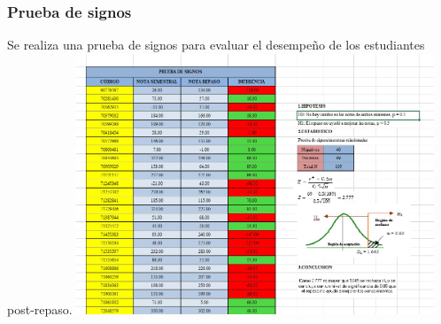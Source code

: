 \begin{frame}
    \frametitle{Prueba de signos}
    Se realiza una prueba de signos para evaluar el desempeño de los estudiantes
    post-repaso.
    \includegraphics[width=0.8\textwidth]{cap/images/signos/signos.jpg}
\end{frame}
